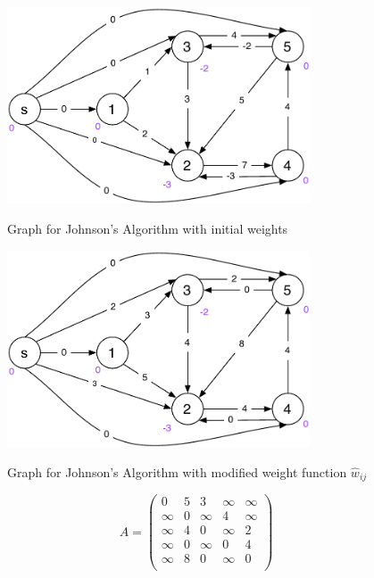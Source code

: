 \documentclass[a4paper, 12pt]{report}
\begin{document}
\begin{figure}[htbp]
    \caption{Graph for Johnson's Algorithm with initial weights}
    \vskip 0.2cm
    \centering
    \includegraphics[width=0.8\textwidth]{Figures/Exercise_10_Initial}
    \label{figure:Exercise_10_Initial}
\end{figure}

\begin{figure}[htbp]
    \caption{
        Graph for Johnson's Algorithm with modified weight function
        $\hat{w}_{ij}$
    }
    \vskip 0.2cm
    \centering
    \includegraphics[width=0.8\textwidth]{Figures/Exercise_10_Modified_Weights}
    \label{figure:Exercise_10_Modified_Weights}
\end{figure}

\[
A =
\left(
    \begin{array}{cccccc}
       0   &   5   &   3   &   ∞   &  ∞    \\
       ∞   &   0   &   ∞   &   4   &  ∞    \\
       ∞   &   4   &   0   &   ∞   &  2    \\
       ∞   &   0   &   ∞   &   0   &  4    \\
       ∞   &   8   &   0   &   ∞   &  0    \\
    \end{array}
\right)
\]
\end{document}
